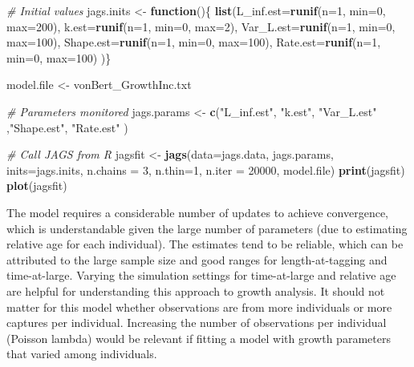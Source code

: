 \documentclass[
]{krantz}
\makeatletter
\newenvironment{Shaded}{\begin{snugshade}}{\end{snugshade}}
\newcommand{\AttributeTok}[1]{\textcolor[rgb]{0.27,0.27,0.27}{#1}}
\newcommand{\CommentTok}[1]{\textcolor[rgb]{0.37,0.37,0.37}{\textit{#1}}}
\newcommand{\ControlFlowTok}[1]{\textcolor[rgb]{0.27,0.27,0.27}{\textbf{#1}}}
\newcommand{\DecValTok}[1]{\textcolor[rgb]{0.06,0.06,0.06}{#1}}
\newcommand{\FunctionTok}[1]{\textcolor[rgb]{0.27,0.27,0.27}{\textbf{#1}}}
\newcommand{\NormalTok}[1]{#1}
\newcommand{\OtherTok}[1]{\textcolor[rgb]{0.37,0.37,0.37}{#1}}
\newcommand{\StringTok}[1]{\textcolor[rgb]{0.5,0.5,0.5}{#1}}
\newenvironment{kframe}{%
\medskip{}
\setlength{\fboxsep}{.8em}
 \def\at@end@of@kframe{}%
 \ifinner\ifhmode%
  \def\at@end@of@kframe{\end{minipage}}%
  \begin{minipage}{\columnwidth}%
 \fi\fi%
 \def\FrameCommand##1{\hskip\@totalleftmargin \hskip-\fboxsep
 \colorbox{shadecolor}{##1}\hskip-\fboxsep
     \hskip-\linewidth \hskip-\@totalleftmargin \hskip\columnwidth}%
 \MakeFramed {\advance\hsize-\width
   \@totalleftmargin\z@ \linewidth\hsize
   \@setminipage}}%
 {\par\unskip\endMakeFramed%
 \at@end@of@kframe}
\renewenvironment{Shaded}{\begin{kframe}}{\end{kframe}}
\makeatother
\begin{document}
\begin{Shaded}
\begin{Highlighting}[]
\CommentTok{\# Initial values}
\NormalTok{jags.inits }\OtherTok{\textless{}{-}} \ControlFlowTok{function}\NormalTok{()\{ }\FunctionTok{list}\NormalTok{(}\AttributeTok{L\_inf.est=}\FunctionTok{runif}\NormalTok{(}\AttributeTok{n=}\DecValTok{1}\NormalTok{, }\AttributeTok{min=}\DecValTok{0}\NormalTok{, }\AttributeTok{max=}\DecValTok{200}\NormalTok{),}
                               \AttributeTok{k.est=}\FunctionTok{runif}\NormalTok{(}\AttributeTok{n=}\DecValTok{1}\NormalTok{, }\AttributeTok{min=}\DecValTok{0}\NormalTok{, }\AttributeTok{max=}\DecValTok{2}\NormalTok{),}
                               \AttributeTok{Var\_L.est=}\FunctionTok{runif}\NormalTok{(}\AttributeTok{n=}\DecValTok{1}\NormalTok{, }\AttributeTok{min=}\DecValTok{0}\NormalTok{, }\AttributeTok{max=}\DecValTok{100}\NormalTok{),}
                               \AttributeTok{Shape.est=}\FunctionTok{runif}\NormalTok{(}\AttributeTok{n=}\DecValTok{1}\NormalTok{, }\AttributeTok{min=}\DecValTok{0}\NormalTok{, }\AttributeTok{max=}\DecValTok{100}\NormalTok{),}
                               \AttributeTok{Rate.est=}\FunctionTok{runif}\NormalTok{(}\AttributeTok{n=}\DecValTok{1}\NormalTok{, }\AttributeTok{min=}\DecValTok{0}\NormalTok{, }\AttributeTok{max=}\DecValTok{100}\NormalTok{)}
\NormalTok{                               )\}}

\NormalTok{model.file }\OtherTok{\textless{}{-}} \StringTok{\textquotesingle{}vonBert\_GrowthInc.txt\textquotesingle{}}

\CommentTok{\# Parameters monitored}
\NormalTok{jags.params }\OtherTok{\textless{}{-}} \FunctionTok{c}\NormalTok{(}\StringTok{"L\_inf.est"}\NormalTok{, }\StringTok{"k.est"}\NormalTok{, }\StringTok{"Var\_L.est"}\NormalTok{ ,}\StringTok{"Shape.est"}\NormalTok{, }\StringTok{"Rate.est"}
\NormalTok{)}

\CommentTok{\# Call JAGS from R}
\NormalTok{jagsfit }\OtherTok{\textless{}{-}} \FunctionTok{jags}\NormalTok{(}\AttributeTok{data=}\NormalTok{jags.data, jags.params, }\AttributeTok{inits=}\NormalTok{jags.inits,}
                \AttributeTok{n.chains =} \DecValTok{3}\NormalTok{, }\AttributeTok{n.thin=}\DecValTok{1}\NormalTok{, }\AttributeTok{n.iter =} \DecValTok{20000}\NormalTok{,}
\NormalTok{                model.file)}
\FunctionTok{print}\NormalTok{(jagsfit)}
\FunctionTok{plot}\NormalTok{(jagsfit)}
\end{Highlighting}
\end{Shaded}

The model requires a considerable number of updates to achieve convergence, which is understandable given the large number of parameters (due to estimating relative age for each individual). The estimates tend to be reliable, which can be attributed to the large sample size and good ranges for length-at-tagging and time-at-large. Varying the simulation settings for time-at-large and relative age are helpful for understanding this approach to growth analysis. It should not matter for this model whether observations are from more individuals or more captures per individual. Increasing the number of observations per individual (Poisson lambda) would be relevant if fitting a model with growth parameters that varied among individuals.
\end{document}
